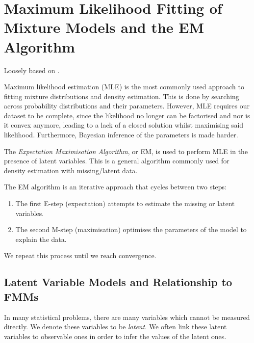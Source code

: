 \documentclass{article}\usepackage[]{graphicx}\usepackage[]{xcolor}
\theoremstyle{plain}
\theoremstyle{definition}
\theoremstyle{remark}
\begin{document}
\newpage



\section{Maximum Likelihood Fitting of Mixture Models and the EM Algorithm}\label{sec:EM}
Loosely based on \cite{EM_Info}.

Maximum likelihood estimation (MLE) is the most commonly used approach to fitting mixture distributions and density estimation. This is done by searching across probability distributions and their parameters. However, MLE requires our dataset to be complete, since the likelihood no longer can be factorised and nor is it convex anymore, leading to a lack of a closed solution whilst maximising said likelihood. Furthermore, Bayesian inference of the parameters is made harder.

The \textit{Expectation Maximisation Algorithm}, or EM, is used to perform MLE in the presence of latent variables. This is a general algorithm commonly used for density estimation with missing/latent data.

The EM algorithm is an iterative approach that cycles between two steps:
\begin{enumerate}
    \item The first E-step (expectation) attempts to estimate the missing or latent variables.
    \item The second M-step (maximisation) optimises the parameters of the model to explain the data.
\end{enumerate}
We repeat this process until we reach convergence.

\subsection{Latent Variable Models and Relationship to FMMs}

In many statistical problems, there are many variables which cannot be measured directly. We denote these variables to be \textit{latent}. We often link these latent variables to observable ones in order to infer the values of the latent ones.
\end{document}
